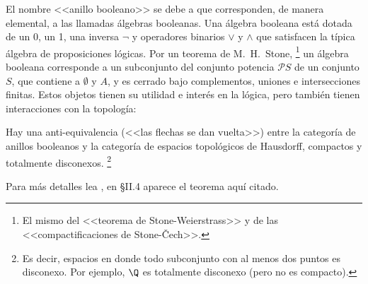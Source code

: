 \documentclass[11pt, reqno]{amsart}
\begin{document}
El nombre <<anillo booleano>> se debe a que corresponden, de manera elemental, a las llamadas álgebras booleanas.
Una álgebra booleana está dotada de un 0, un 1, una inversa $\neg$ y operadores binarios $\vee$ y $\wedge$ que
satisfacen la típica álgebra de proposiciones lógicas.
Por un teorema de M.~H.~Stone,%
\footnote{El mismo del <<teorema de Stone-Weierstrass>> y de las <<compactificaciones de Stone-\v Cech>>.}
un álgebra booleana corresponde a un subconjunto del conjunto potencia $\mathcal{P} S$ de un conjunto $S$, que contiene
a $\emptyset$ y $A$, y es cerrado bajo complementos, uniones e intersecciones finitas.
Estos objetos tienen su utilidad e interés en la lógica, pero también tienen interacciones con la topología:
\begin{thm}
	Hay una anti-equivalencia (<<las flechas se dan vuelta>>) entre la categoría de anillos booleanos y la categoría
	de espacios topológicos de Hausdorff, compactos y totalmente disconexos.%
	\footnote{Es decir, espacios en donde todo subconjunto con al menos dos puntos es disconexo. Por ejemplo, $\Q$
	es totalmente disconexo (pero no es compacto).}
\end{thm}
Para más detalles lea \cite{johnstone:stone}, en \S II.4 aparece el teorema aquí citado.

\printbibliography
\end{document}
